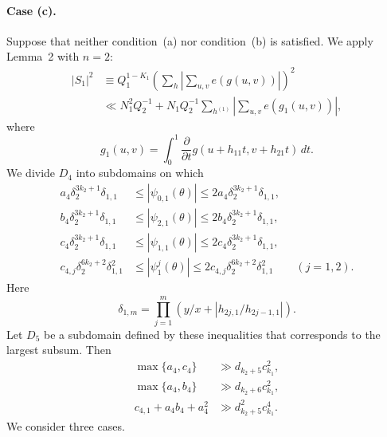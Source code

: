 \documentclass[10pt]{article}
\begin{document}
\paragraph{Case (c).}
Suppose that neither condition~(a) nor condition~(b) is satisfied. We apply Lemma~2 with $n=2$:
\[
\begin{aligned}
  |S_1|^2
  &\equiv Q_1^{1-K_1}
    \left(\sum_h\left|\sum_{u,v}e(g(u,v))\right|\right)^2\\
  &\ll N_1^2Q_2^{-1}
    +N_1Q_2^{-1}\sum_{h^{(1)}}
      \left|\sum_{u,v}e(g_1(u,v))\right|,
\end{aligned}
\]
where
\[
  g_1(u,v)=\int_0^1\frac{\partial}{\partial t}
    g(u+h_{11}t,v+h_{21}t)\,dt.
\]
We divide $D_4$ into subdomains on which
\[
\begin{aligned}
  a_4\delta_2^{3k_2+1}\delta_{1,1}
  &\leqslant|\psi_{0,1}(\theta)|
   \leqslant2a_4\delta_2^{3k_2+1}\delta_{1,1},\\
  b_4\delta_2^{3k_2+1}\delta_{1,1}
  &\leqslant|\psi_{2,1}(\theta)|
   \leqslant2b_4\delta_2^{3k_2+1}\delta_{1,1},\\
  c_4\delta_2^{3k_2+1}\delta_{1,1}
  &\leqslant|\psi_{1,1}(\theta)|
   \leqslant2c_4\delta_2^{3k_2+1}\delta_{1,1},\\
  c_{4,j}\delta_2^{6k_2+2}\delta_{1,1}^2
  &\leqslant|\psi_1^j(\theta)|
   \leqslant2c_{4,j}\delta_2^{6k_2+2}\delta_{1,1}^2
  \qquad(j=1,2).
\end{aligned}
\]
Here
\[
  \delta_{1,m}=\prod_{j=1}^m
  \left(y/x+\left|h_{2j,1}/h_{2j-1,1}\right|\right).
\]
Let $D_5$ be a subdomain defined by these inequalities that corresponds to the largest subsum. Then
\begin{equation}
\begin{aligned}
  \max\{a_4,c_4\}&\gg d_{k_2+5}c_{k_1}^2,\\
  \max\{a_4,b_4\}&\gg d_{k_2+6}c_{k_1}^2,\\
  c_{4,1}+a_4b_4+a_4^2&\gg d_{k_2+5}^2c_{k_1}^4.
\end{aligned}
\tag{9}
\end{equation}
We consider three cases.
\end{document}
